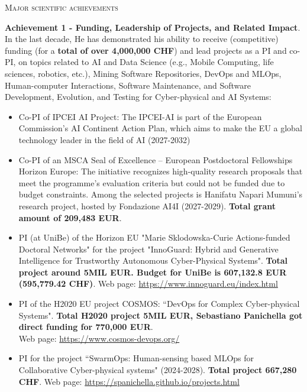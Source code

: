 \documentclass[11pt]{article}
\begin{document}
\vspace{2.5mm}


\textsc{\fontsize{14}{12}\selectfont Major scientific achievements}


\noindent \textbf{Achievement 1 - Funding, Leadership of Projects, and Related Impact}. 
In the last decade, He has demonstrated his ability to receive (competitive) funding (for a \textbf{total of over 4,000,000 CHF}) and lead projects as a PI
and co-PI, on topics related to AI and Data Science (e.g., Mobile Computing, life sciences, robotics, etc.), Mining Software
Repositories, DevOps and MLOps, Human-computer Interactions, Software Maintenance, and
Software Development, Evolution, and Testing for Cyber-physical and AI Systems:

\vspace{-3.5mm}
\begin{itemize}
\item Co-PI of IPCEI AI Project: The IPCEI-AI is part of the European Commission's AI Continent Action Plan, which aims to make the EU a global technology leader in the field of AI (2027-2032) 
\item Co-PI of an MSCA Seal of Excellence – European Postdoctoral Fellowships Horizon Europe: The initiative recognizes high-quality research proposals that meet the programme’s evaluation criteria but could not be funded due to budget constraints. Among the selected projects is Hanifatu Napari Mumuni’s research project, hosted by Fondazione AI4I  (2027-2029). \textbf{Total grant amount of 209,483 EUR}. 
  \item PI (at UniBe) of the Horizon EU  "Marie Sklodowska-Curie Actions-funded Doctoral Networks" for the project "InnoGuard: Hybrid and Generative Intelligence for Trustworthy Autonomous Cyber-Physical Systems".
\textbf{Total project around 5MIL EUR. Budget for UniBe is 607,132.8 EUR (595,779.42 CHF)}. Web page: \href{https://www.innoguard.eu/index.html}{https://www.innoguard.eu/index.html}
\vspace{-2.5mm}
  \item PI of the H2020 EU project COSMOS: ``DevOps for Complex Cyber-physical Systems". \textbf{Total H2020 project 5MIL EUR, Sebastiano Panichella got direct funding for 770,000 EUR}. \\Web page: \href{https://www.cosmos-devops.org/}{https://www.cosmos-devops.org/}
\vspace{-2.5mm}
\item PI for   the project ``SwarmOps: Human-sensing based MLOps for Collaborative Cyber-physical systems" (2024-2028).  \textbf{Total project 667,280 CHF}.  Web page: \href{https://spanichella.github.io/projects.html}{https://spanichella.github.io/projects.html}

\end{itemize}
\end{document}
